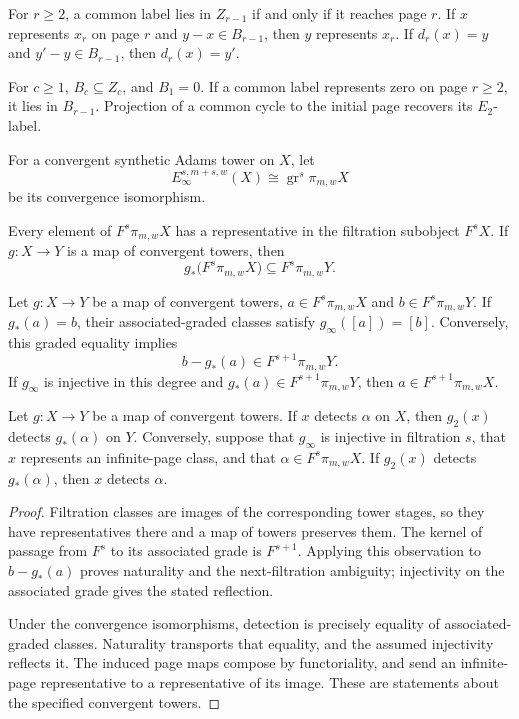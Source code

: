 For $r\geq2$, a common label lies in $Z_{r-1}$ if and only if it reaches page $r$. If $x$ represents $x_r$ on page $r$ and $y-x\in B_{r-1}$, then $y$ represents $x_r$. If $d_r(x)=y$ and $y'-y\in B_{r-1}$, then $d_r(x)=y'$.

For $c\geq1$, $B_c\subseteq Z_c$, and $B_1=0$. If a common label represents zero on page $r\geq2$, it lies in $B_{r-1}$. Projection of a common cycle to the initial page recovers its $E_2$-label.

\begin{theorem}
\label{sem:ProofTools:filtration-representatives}
For a convergent synthetic Adams tower on $X$, let
\[E_\infty^{s,m+s,w}(X)\cong\operatorname{gr}^s\pi_{m,w}X\]
be its convergence isomorphism.

Every element of $F^s\pi_{m,w}X$ has a representative in the filtration subobject $F^sX$. If $g:X\to Y$ is a map of convergent towers, then
\[g_*\bigl(F^s\pi_{m,w}X\bigr)\subseteq F^s\pi_{m,w}Y.\]

Let $g:X\to Y$ be a map of convergent towers, $a\in F^s\pi_{m,w}X$ and $b\in F^s\pi_{m,w}Y$. If $g_*(a)=b$, their associated-graded classes satisfy $g_\infty([a])=[b]$. Conversely, this graded equality implies
\[b-g_*(a)\in F^{s+1}\pi_{m,w}Y.\]
If $g_\infty$ is injective in this degree and $g_*(a)\in F^{s+1}\pi_{m,w}Y$, then $a\in F^{s+1}\pi_{m,w}X$.

Let $g:X\to Y$ be a map of convergent towers. If $x$ detects $\alpha$ on $X$, then $g_2(x)$ detects $g_*(\alpha)$ on $Y$. Conversely, suppose that $g_\infty$ is injective in filtration $s$, that $x$ represents an infinite-page class, and that $\alpha\in F^s\pi_{m,w}X$. If $g_2(x)$ detects $g_*(\alpha)$, then $x$ detects $\alpha$.
\end{theorem}
\begin{proof}
Filtration classes are images of the corresponding tower stages, so they have representatives there and a map of towers preserves them. The kernel of passage from $F^s$ to its associated grade is $F^{s+1}$. Applying this observation to $b-g_*(a)$ proves naturality and the next-filtration ambiguity; injectivity on the associated grade gives the stated reflection.

Under the convergence isomorphisms, detection is precisely equality of associated-graded classes. Naturality transports that equality, and the assumed injectivity reflects it. The induced page maps compose by functoriality, and send an infinite-page representative to a representative of its image. These are statements about the specified convergent towers.
\end{proof}

